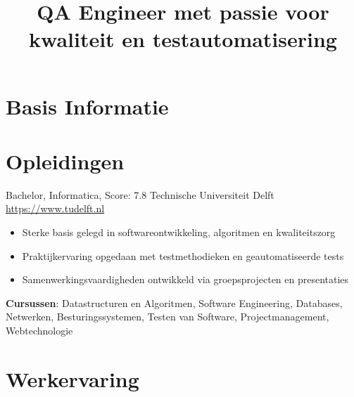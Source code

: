 \documentclass[a4paper, serif, 10pt]{moderncv}
\title{QA Engineer met passie voor kwaliteit en testautomatisering}
\begin{document}
\maketitle

\section{Basis Informatie}

\section{Opleidingen}

        {Bachelor, Informatica, Score: 7.8}
        {Technische Universiteit Delft}
        {\url{https://www.tudelft.nl}}
        {}
        {\begin{itemize}
\item Sterke basis gelegd in softwareontwikkeling, algoritmen en kwaliteitszorg
\item Praktijkervaring opgedaan met testmethodieken en geautomatiseerde tests
\item Samenwerkingsvaardigheden ontwikkeld via groepsprojecten en presentaties
\end{itemize}
\textbf{Cursussen}: Datastructuren en Algoritmen, Software Engineering, Databases, Netwerken, Besturingssystemen, Testen van Software, Projectmanagement, Webtechnologie}
\section{Werkervaring}
\end{document}
